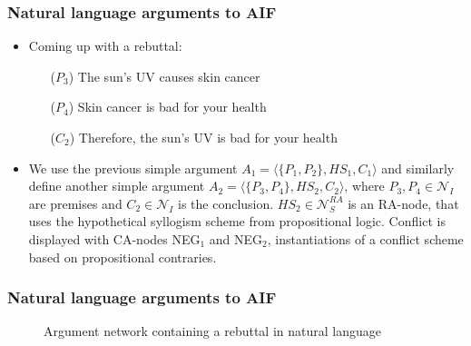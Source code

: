 \documentclass{beamer}
\begin{document}
\begin{frame}
\frametitle{Natural language arguments to AIF}
\begin{itemize}
\item Coming up with a rebuttal: \pause
  \begin{itemize}
  \item[($P_3$)] The sun's UV causes skin cancer \pause
  \item[($P_4$)] Skin cancer is bad for your health \pause
  \item[($C_2$)] Therefore, the sun's UV is bad for your health \pause
  \end{itemize}
\item We use the previous simple argument $A_1 = \langle \lbrace P_1, P_2 \rbrace, HS_1, C_1\rangle$ and similarly define another simple argument $A_2 = \langle \lbrace P_3, P_4 \rbrace, HS_2, C_2\rangle$, where $P_3, P_4 \in \mathcal{N}_I$ are premises and $C_2 \in \mathcal{N}_I$ is the conclusion. $HS_2 \in \mathcal{N}_S^{RA}$ is an RA-node, that uses the hypothetical syllogism scheme from propositional logic. Conflict is displayed with CA-nodes NEG$_1$ and NEG$_2$, instantiations of a conflict scheme based on propositional contraries.
\end{itemize}
\end{frame}

\begin{frame}
\frametitle{Natural language arguments to AIF}
\begin{figure}
\centering
{}
\caption{Argument network containing a rebuttal in natural language} \label{rebutargnet}
\end{figure}
\end{frame}

\end{document}
